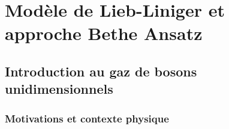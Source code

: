 



\makeatletter








%



\tableofcontents




\newpage


                
%


%

\part{Modèle de Lieb-Liniger et approche Bethe Ansatz}

\chapter{Introduction au gaz de bosons unidimensionnels}
\minitoc
\section{Motivations et contexte physique}
